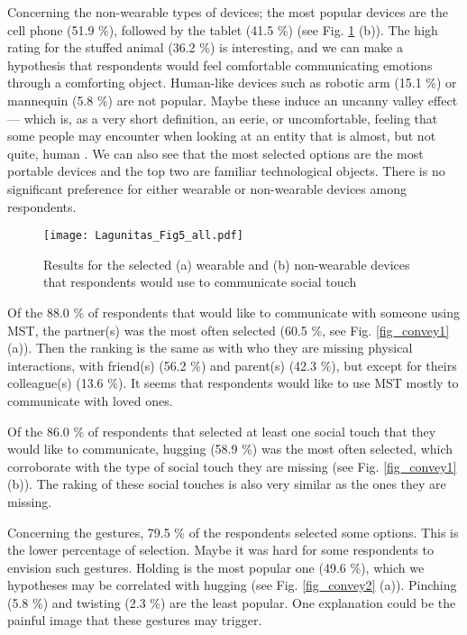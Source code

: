 \documentclass[acmsmall]{acmart}
\begin{document}
Concerning the non-wearable types of devices; the most popular devices are the cell phone (51.9 \%), followed by the tablet (41.5 \%) (see Fig. \ref{fig_devices} (b)). The high rating for the stuffed animal (36.2 \%) is interesting, and we can make a hypothesis that respondents would feel comfortable communicating emotions through a comforting object. Human-like devices such as robotic arm (15.1 \%) or mannequin (5.8 \%) are not popular. Maybe these induce an uncanny valley effect — which is, as a very short definition, an eerie, or uncomfortable, feeling that some people may encounter when looking at an entity that is almost, but not quite, human \cite{mori2012uncanny}. We can also see that the most selected options are the most portable devices and the top two are familiar technological objects. There is no significant preference for either wearable or non-wearable devices among respondents.

\begin{figure}[!t]
	\centering
	\texttt{[image: Lagunitas\_Fig5\_all.pdf]}
	\caption{Results for the selected (a) wearable and (b) non-wearable devices that respondents would use to communicate social touch}
	\label{fig_devices}
\end{figure}

Of the 88.0 \% of respondents that would like to communicate with someone using MST, the partner(s) was the most often selected (60.5 \%, see Fig. \ref{fig_convey1} (a)). Then the ranking is the same as with who they are missing physical interactions, with friend(s) (56.2 \%) and parent(s) (42.3 \%), but except for theirs colleague(s) (13.6 \%). It seems that respondents would like to use MST mostly to communicate with loved ones.  

Of the 86.0 \% of respondents that selected at least one social touch that they would like to communicate, hugging (58.9 \%) was the most often selected, which corroborate with the type of social touch they are missing (see Fig. \ref{fig_convey1} (b)). The raking of these social touches is also very similar as the ones they are missing.

Concerning the gestures, 79.5 \% of the respondents selected some options. This is the lower percentage of selection. Maybe it was hard for some respondents to envision such gestures. Holding is the most popular one (49.6 \%), which we hypotheses may be correlated with hugging (see Fig. \ref{fig_convey2} (a)). Pinching (5.8 \%) and twisting (2.3 \%) are the least popular. One explanation could be the painful image that these gestures may trigger.
\end{document}
